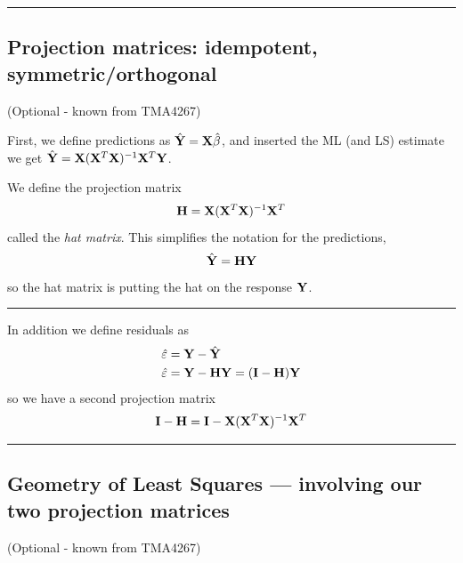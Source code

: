 \documentclass[
]{article}
\begin{document}
\begin{center}\rule{0.5\linewidth}{0.5pt}\end{center}

\hypertarget{projection-matrices-idempotent-symmetricorthogonal}{%
\subsection{Projection matrices: idempotent,
symmetric/orthogonal}\label{projection-matrices-idempotent-symmetricorthogonal}}

(Optional - known from TMA4267)

First, we define predictions as \(\hat{\bf Y}={\bf X}\hat{\beta}\), and
inserted the ML (and LS) estimate we get
\(\hat{\bf Y}={\bf X}({\bf X}^T{\bf X})^{-1}{\bf X}^T{\bf Y}\).

We define the projection matrix
\[  {\bf H}={\bf X}({\bf X}^T{\bf X})^{-1} {\bf X}^T\] called the
\emph{hat matrix}. This simplifies the notation for the predictions,
\[\hat{\bf Y}={\bf H}{\bf Y}\] so the hat matrix is putting the hat on
the response \({\bf Y}\).

\begin{center}\rule{0.5\linewidth}{0.5pt}\end{center}

In addition we define residuals as \begin{align*}
\hat{\varepsilon}&={\bf Y}-\hat{\bf Y} \\
\hat{\varepsilon}&={\bf Y}-{\bf HY}=({\bf I-H}){\bf Y}\\
\end{align*} so we have a second projection matrix
\[ {\bf I-H}={\bf I}-{\bf X}({\bf X}^T{\bf X})^{-1} {\bf X}^T \]

\begin{center}\rule{0.5\linewidth}{0.5pt}\end{center}

\hypertarget{geometry-of-least-squares-involving-our-two-projection-matrices}{%
\subsection{Geometry of Least Squares --- involving our two projection
matrices}\label{geometry-of-least-squares-involving-our-two-projection-matrices}}

(Optional - known from TMA4267)
\end{document}
